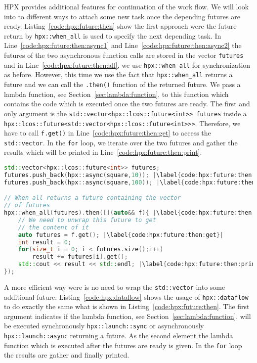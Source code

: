 HPX provides additional features for continuation of the work flow. We will look into to different ways to attach some new task once the depending futures are ready. Listing~\ref{code:hpx:future:then} show the first approach were the future return by \lstinline|hpx::when_all| is used to specify the next depending task. In Line~\ref{code:hpx:future:then:async1} and Line~\ref{code:hpx:future:then:async2} the futures of the two asynchronous function calls are stored in the vector \lstinline|futures| and in Line~\ref{code:hpx:future:then:all}, we use \lstinline|hpx::when_all| for synchronization as before. However, this time we use the fact that \lstinline|hpx::when_all| returns a future and we can call the \lstinline|.then()| function of the returned future. We pass a lambda function, see Section~\ref{sec:lambda:function}, to this function which contains the code which is executed once the two futures are ready. The first and only argument is the \lstinline|std::vector<hpx::lcos::future<int>> futures| inside a \lstinline|hpx::lcos::future<std::vector<hpx::lcos::future<int>>>|. Therefore, we have to call \lstinline|f.get()| in Line~\ref{code:hpx:future:then:get} to access the \lstinline|std::vector|. In the \lstinline|for| loop, we iterate over the two futures and gather the results which will be printed in Line~\ref{code:hpx:future:then:print}.


\begin{lstlisting}[language=c++,caption={Usage of \lstinline|hpx::when_all.then()| for the continuation of futures.\label{code:hpx:future:then}},float,floatplacement=htb,escapechar=|]
std::vector<hpx::lcos::future<int>> futures;
futures.push_back(hpx::async(square,10)); |\label{code:hpx:future:then:async1}|
futures.push_back(hpx::async(square,100)); |\label{code:hpx:future:then:async2}|

// When all returns a future containing the vector 
// of futures
hpx::when_all(futures).then([](auto&& f){ |\label{code:hpx:future:then:all}|
    // We need to unwrap this future to get 
    // the content of it
    auto futures = f.get(); |\label{code:hpx:future:then:get}|
    int result = 0;
    for(size_t i = 0; i < futures.size();i++)
        result += futures[i].get();
    std::cout << result << std::endl; |\label{code:hpx:future:then:print}|
});
\end{lstlisting}

A more efficient way were is no need to wrap the \lstinline|std::vector| into some additional future. Listing~\ref{code:hpx:dataflow} shows the usage of \lstinline|hpx::dataflow| to do exactly the same what is shown in Listing~\ref{code:hpx:future:then}. The first argument indicates if the lambda function, see Section~\ref{sec:lambda:function}, will be executed synchronously \lstinline|hpx::launch::sync| or asynchronously \lstinline|hpx::launch::async| returning a future. As the second element the lambda function which is executed after the futures are ready is given. In the \lstinline|for| loop the results are gather and finally printed.



